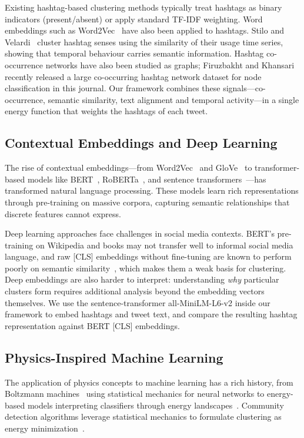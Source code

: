 \documentclass[pdflatex,sn-mathphys-num]{sn-jnl}%
\begin{document}
Existing hashtag-based clustering methods typically treat hashtags as binary indicators (present/absent) or apply standard TF-IDF weighting. Word embeddings such as Word2Vec~\cite{mikolov2013} have also been applied to hashtags. Stilo and Velardi~\cite{stilo2017} cluster hashtag senses using the similarity of their usage time series, showing that temporal behaviour carries semantic information. Hashtag co-occurrence networks have also been studied as graphs; Firuzbakht and Khansari~\cite{firuzbakht2025} recently released a large co-occurring hashtag network dataset for node classification in this journal. Our framework combines these signals---co-occurrence, semantic similarity, text alignment and temporal activity---in a single energy function that weights the hashtags of each tweet.

\subsection{Contextual Embeddings and Deep Learning}\label{subsec5}

The rise of contextual embeddings---from Word2Vec~\cite{mikolov2013} and GloVe~\cite{pennington2014} to transformer-based models like BERT~\cite{devlin2018}, RoBERTa~\cite{liu2019roberta}, and sentence transformers~\cite{reimers2019}---has transformed natural language processing. These models learn rich representations through pre-training on massive corpora, capturing semantic relationships that discrete features cannot express.

Deep learning approaches face challenges in social media contexts. BERT's pre-training on Wikipedia and books may not transfer well to informal social media language, and raw [CLS] embeddings without fine-tuning are known to perform poorly on semantic similarity~\cite{reimers2019}, which makes them a weak basis for clustering. Deep embeddings are also harder to interpret: understanding \emph{why} particular clusters form requires additional analysis beyond the embedding vectors themselves. We use the sentence-transformer all-MiniLM-L6-v2 inside our framework to embed hashtags and tweet text, and compare the resulting hashtag representation against BERT [CLS] embeddings.

\subsection{Physics-Inspired Machine Learning}\label{subsec6}

The application of physics concepts to machine learning has a rich history, from Boltzmann machines~\cite{hinton1984} using statistical mechanics for neural networks to energy-based models interpreting classifiers through energy landscapes~\cite{grathwohl2019}. Community detection algorithms leverage statistical mechanics to formulate clustering as energy minimization~\cite{reichardt2006,traag2011}.
\end{document}

